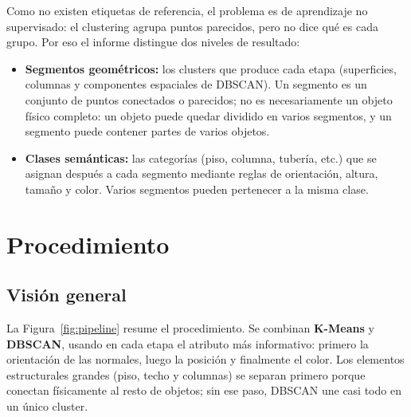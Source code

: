 \documentclass[11pt,a4paper]{article}
\begin{document}
Como no existen etiquetas de referencia, el problema es de aprendizaje no
supervisado: el clustering agrupa puntos parecidos, pero no dice qué es cada
grupo. Por eso el informe distingue dos niveles de resultado:
\begin{itemize}
  \item \textbf{Segmentos geométricos:} los clusters que produce cada etapa
        (superficies, columnas y componentes espaciales de DBSCAN). Un
        segmento es un conjunto de puntos conectados o parecidos; no es
        necesariamente un objeto físico completo: un objeto puede quedar
        dividido en varios segmentos, y un segmento puede contener partes de
        varios objetos.
  \item \textbf{Clases semánticas:} las categorías (piso, columna, tubería,
        etc.) que se asignan después a cada segmento mediante reglas de
        orientación, altura, tamaño y color. Varios segmentos pueden
        pertenecer a la misma clase.
\end{itemize}

\section{Procedimiento}

\subsection{Visión general}

La Figura~\ref{fig:pipeline} resume el procedimiento. Se combinan
\textbf{K-Means} y \textbf{DBSCAN}, usando en cada etapa el atributo más
informativo: primero la orientación de las normales, luego la posición y
finalmente el color. Los elementos estructurales grandes (piso, techo y
columnas) se separan primero porque conectan físicamente al resto de objetos;
sin ese paso, DBSCAN une casi todo en un único cluster.
\end{document}

